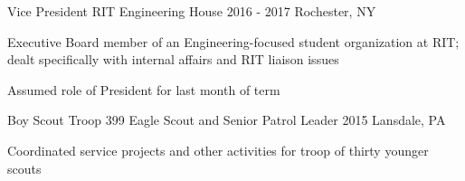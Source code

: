 \begin{cventries}
	\cventry
		{Vice President}
		{RIT Engineering House}
		{2016 - 2017}
		{Rochester, NY}
		{
			\begin{cvitems}
			\item {Executive Board member of an Engineering-focused student organization at RIT; dealt specifically with internal affairs and RIT liaison issues}
			\item {Assumed role of President for last month of term}
			\end{cvitems}
		}

	\cventry
		{Boy Scout Troop 399}
		{Eagle Scout and Senior Patrol Leader}
		{2015}
		{Lansdale, PA}
		{
			\begin{cvitems}
			\item{Coordinated service projects and other activities for troop of thirty younger scouts}
			\end{cvitems}
		}
\end{cventries}

